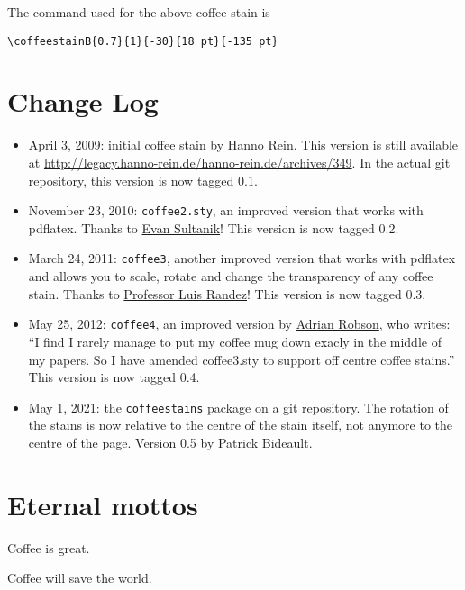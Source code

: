 \documentclass[a4paper, 11pt, BCOR = 0 pt, oneside, english]{scrartcl}
\begin{document}
\vfill{}

\begin{tcolorbox}
  The command used for the above coffee stain is

  \verb|\coffeestainB{0.7}{1}{-30}{18 pt}{-135 pt}|
\end{tcolorbox}
\newpage{}
\section{Change Log}
\begin{itemize}
\item April 3, 2009: initial coffee stain by Hanno Rein. This version is still
  available at \url{http://legacy.hanno-rein.de/hanno-rein.de/archives/349}. In the actual git repository, this version is now tagged 0.1.
\item November 23, 2010: \texttt{coffee2.sty}, an improved version that works
  with pdflatex. Thanks to \href{http://www.sultanik.com/}{Evan Sultanik}! This
  version is now tagged 0.2.
\item March 24, 2011: \texttt{coffee3}, another improved version that works with
  pdflatex and allows you to scale, rotate and change the transparency of any
  coffee stain. Thanks to \href{http://pcmap.unizar.es/~pilar/}{Professor Luis
    Randez}! This version is now tagged 0.3.
\item May 25, 2012: \texttt{coffee4}, an improved version by
  \href{http://nepsweb.co.uk/homeapr/}{Adrian Robson}, who writes: “I find
  I rarely manage to put my coffee mug down exacly in the middle of my papers.
  So I have amended coffee3.sty to support off centre coffee stains.” This
  version is now tagged 0.4.
\item May 1, 2021: the \texttt{coffeestains} package on a git repository. The
  rotation of the stains is now relative to the centre of the stain itself, not
  anymore to the centre of the page. Version 0.5 by Patrick Bideault.
\end{itemize}
\label{stainC}

\section{Eternal mottos}

Coffee is great.

\vspace{5mm}

\noindent
Coffee will save the world.

\vfill{}
\end{document}
